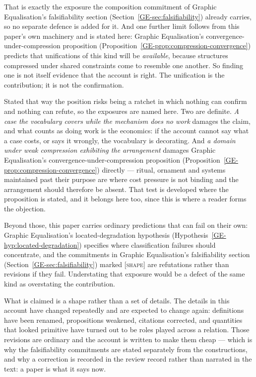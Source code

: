 \documentclass[11pt,a4paper]{article}
\begin{document}
That is exactly the exposure the composition commitment of Graphic Equalisation's falsifiability
section (Section~\ref{GE-sec:falsifiability}) already carries, so no separate defence is added for it. And one further limit follows from this paper's own
machinery and is stated here:
Graphic Equalisation's convergence-under-compression proposition
(Proposition~\ref{GE-prop:compression-convergence}) predicts that unifications of this kind will be
\emph{available}, because structures compressed under shared constraints come to resemble one another.
So finding one is not itself evidence that the account is right. The unification is the contribution;
it is not the confirmation.

Stated that way the position risks being a ratchet in which nothing can confirm and nothing can
refute, so the exposures are named here. Two are definite.
\emph{A case the vocabulary covers while the mechanism does no work} damages the claim, and what
counts as doing work is the economics: if the account cannot say what a case costs, or says it
wrongly, the vocabulary is decorating. And \emph{a domain under weak compression exhibiting the
arrangement} damages Graphic Equalisation's convergence-under-compression proposition
(Proposition~\ref{GE-prop:compression-convergence}) directly --- ritual, ornament and
systems maintained past their purpose are where cost pressure is not binding and the arrangement
should therefore be absent. That test is developed where the proposition is stated, and it belongs
here too, since this is where a reader forms the objection.

Beyond those, this paper carries ordinary predictions that can fail on their own:
Graphic Equalisation's located-degradation hypothesis (Hypothesis~\ref{GE-hyp:located-degradation})
specifies where classification failures should concentrate,
and the commitments in Graphic Equalisation's falsifiability section
(Section~\ref{GE-sec:falsifiability}) marked \textsc{[shape]} are refutations rather
than revisions if they fail. Understating that exposure would be a defect of the same kind as
overstating the contribution.

What is claimed is a shape rather than a set of details. The details in this account have changed
repeatedly and are expected to change again: definitions have been renamed, propositions weakened,
citations corrected, and quantities that looked primitive have turned out to be roles played across a
relation. Those revisions are ordinary and the account is written to make them cheap --- which is why
the falsifiability commitments are stated separately from the constructions, and why a correction is
recorded in the review record rather than narrated in the text: a paper is what it says now.
\end{document}
